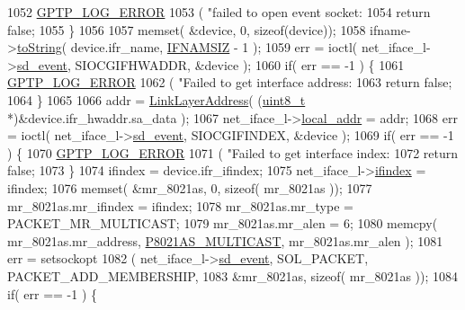 \begin{DoxyCode}
{1052         \hyperlink{gptp__log_8hpp_afefbb1009717c128012bfeed94842987}{GPTP\_LOG\_ERROR}
1053             ( \textcolor{stringliteral}{"failed to open event socket: %
1054         \textcolor{keywordflow}{return} \textcolor{keyword}{false};
1055     \}
1056 
1057     memset( &device, 0, \textcolor{keyword}{sizeof}(device));
1058     ifname->\hyperlink{class_interface_name_a92a0be2fe51f7da8a6073637d8b7c518}{toString}( device.ifr\_name, \hyperlink{openavb__avdecc__pub_8h_acd06da230a96d3b7e6f193c5b3142002}{IFNAMSIZ} - 1 );
1059     err = ioctl( net\_iface\_l->\hyperlink{class_linux_network_interface_ab2e41169dafb40e1ab917422a2d1145a}{sd\_event}, SIOCGIFHWADDR, &device );
1060     \textcolor{keywordflow}{if}( err == -1 ) \{
1061         \hyperlink{gptp__log_8hpp_afefbb1009717c128012bfeed94842987}{GPTP\_LOG\_ERROR}
1062             ( \textcolor{stringliteral}{"Failed to get interface address: %
1063         \textcolor{keywordflow}{return} \textcolor{keyword}{false};
1064     \}
1065 
1066     addr = \hyperlink{class_link_layer_address}{LinkLayerAddress}( (\hyperlink{stdint_8h_aba7bc1797add20fe3efdf37ced1182c5}{uint8\_t} *)&device.ifr\_hwaddr.sa\_data );
1067     net\_iface\_l->\hyperlink{class_linux_network_interface_af3d1546f688fbb9cec0317d152cab1da}{local\_addr} = addr;
1068     err = ioctl( net\_iface\_l->\hyperlink{class_linux_network_interface_ab2e41169dafb40e1ab917422a2d1145a}{sd\_event}, SIOCGIFINDEX, &device );
1069     \textcolor{keywordflow}{if}( err == -1 ) \{
1070         \hyperlink{gptp__log_8hpp_afefbb1009717c128012bfeed94842987}{GPTP\_LOG\_ERROR}
1071             ( \textcolor{stringliteral}{"Failed to get interface index: %
1072         \textcolor{keywordflow}{return} \textcolor{keyword}{false};
1073     \}
1074     ifindex = device.ifr\_ifindex;
1075     net\_iface\_l->\hyperlink{class_linux_network_interface_a01e636f8746c84f1cf3d45c4afbfde35}{ifindex} = ifindex;
1076     memset( &mr\_8021as, 0, \textcolor{keyword}{sizeof}( mr\_8021as ));
1077     mr\_8021as.mr\_ifindex = ifindex;
1078     mr\_8021as.mr\_type = PACKET\_MR\_MULTICAST;
1079     mr\_8021as.mr\_alen = 6;
1080     memcpy( mr\_8021as.mr\_address, \hyperlink{linux__hal__common_8hpp_a10940df49c9c0cbf6ab33c8bf858c3b6}{P8021AS\_MULTICAST}, mr\_8021as.mr\_alen );
1081     err = setsockopt
1082         ( net\_iface\_l->\hyperlink{class_linux_network_interface_ab2e41169dafb40e1ab917422a2d1145a}{sd\_event}, SOL\_PACKET, PACKET\_ADD\_MEMBERSHIP,
1083           &mr\_8021as, \textcolor{keyword}{sizeof}( mr\_8021as ));
1084     \textcolor{keywordflow}{if}( err == -1 ) \{
}}}}
\end{DoxyCode}

